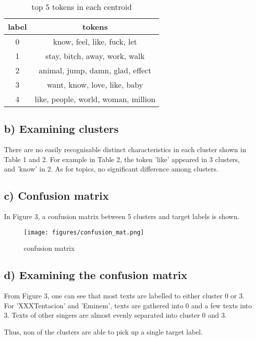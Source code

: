 \documentclass[a4paper,11pt]{article}
\begin{document}
\begin{table}[htb]

  \begin{center}
  \caption{top 5 tokens in each centroid}

  \begin{tabular}{|c|c|} 
    label & tokens\\ \hline \hline
    0 & know, feel, like, fuck, let \\ \hline
    1 & stay, bitch, away, work, walk\\ \hline
    2 & animal, jump, damn, glad, effect\\ \hline
    3 & want, know, love, like, baby\\ \hline
    4 & like, people, world, woman, million\\ \hline
  \end{tabular}
  \end{center}
\end{table}


\subsection{b) Examining clusters}
There are no easily recognisable distinct characteristics in each cluster shown in Table 1 and 2.
For example in Table 2, the token 'like' appeared in 3 clusters, and 'know' in 2.
As for topics, no significant difference among clusters.
\subsection{c) Confusion matrix}
In Figure 3, a confusion matrix between 5 clusters and target labels is shown.

\begin{figure}[htbp]
  \begin{center}
  \texttt{[image: figures/confusion\_mat.png]}
  \caption{confusion matrix}
  \end{center}
\end{figure}
\subsection{d) Examining the confusion matrix}
From Figure 3, one can see that most texts are labelled to either cluster 0 or 3. 
For 'XXXTentacion' and 'Eminem', texts are gathered into 0 and a few texts into 3.
Texts of other singers are almost evenly separated into cluster 0 and 3.

Thus, non of the clusters are able to pick up a single target label.
\end{document}
